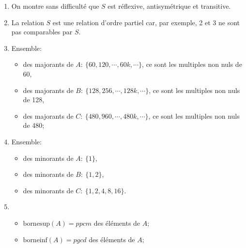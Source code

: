     \begin{enumerate}
        \item On montre sans difficulté que $S$ est réflexive, antisymétrique et transitive.
        \item La relation $S$ est une relation d'ordre partiel car, par exemple, 2 et 3 ne sont pas comparables par $S$.
        \item Ensemble: \begin{itemize}
            \item des majorants de $A:\ \{60, 120, \cdots, 60k, \cdots\}$, ce sont les multiples non nuls de 60,
            \item des majorants de $B:\ \{128, 256, \cdots, 128k, \cdots\}$, ce sont les multiples non nuls de 128,
            \item des majorants de $C:\ \{480, 960, \cdots, 480k, \cdots\}$, ce sont les multiples non nuls de 480;
        \end{itemize}
        \item Ensemble: \begin{itemize}
            \item des minorants de $A:\ \{1\}$,
            \item des minorants de $B:\ \{1, 2\}$,
            \item des minorants de $C:\ \{1, 2, 4, 8, 16\}$.
        \end{itemize}
        \item \begin{itemize}
            \item  $\text{bornesup}(A)=ppcm$ des éléments de $A$;
            \item  $\text{borneinf}(A)=pgcd$ des éléments de $A$;
        \end{itemize}
    \end{enumerate}
